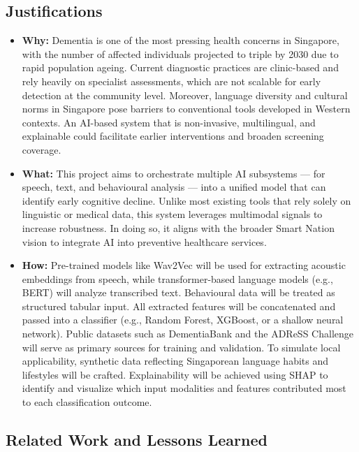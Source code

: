\documentclass[12pt]{article}
\begin{document}
\subsection*{Justifications}
\begin{itemize}

    \item \textbf{Why:} Dementia is one of the most pressing health concerns in Singapore, with the number of affected individuals projected to triple by 2030 due to rapid population ageing. Current diagnostic practices are clinic-based and rely heavily on specialist assessments, which are not scalable for early detection at the community level. Moreover, language diversity and cultural norms in Singapore pose barriers to conventional tools developed in Western contexts. An AI-based system that is non-invasive, multilingual, and explainable could facilitate earlier interventions and broaden screening coverage.

    \item \textbf{What:} This project aims to orchestrate multiple AI subsystems — for speech, text, and behavioural analysis — into a unified model that can identify early cognitive decline. Unlike most existing tools that rely solely on linguistic or medical data, this system leverages multimodal signals to increase robustness. In doing so, it aligns with the broader Smart Nation vision to integrate AI into preventive healthcare services.

    \item \textbf{How:} Pre-trained models like Wav2Vec will be used for extracting acoustic embeddings from speech, while transformer-based language models (e.g., BERT) will analyze transcribed text. Behavioural data will be treated as structured tabular input. All extracted features will be concatenated and passed into a classifier (e.g., Random Forest, XGBoost, or a shallow neural network). Public datasets such as DementiaBank and the ADReSS Challenge will serve as primary sources for training and validation. To simulate local applicability, synthetic data reflecting Singaporean language habits and lifestyles will be crafted. Explainability will be achieved using SHAP to identify and visualize which input modalities and features contributed most to each classification outcome.
\end{itemize}
\subsection*{Related Work and Lessons Learned}
\end{document}
